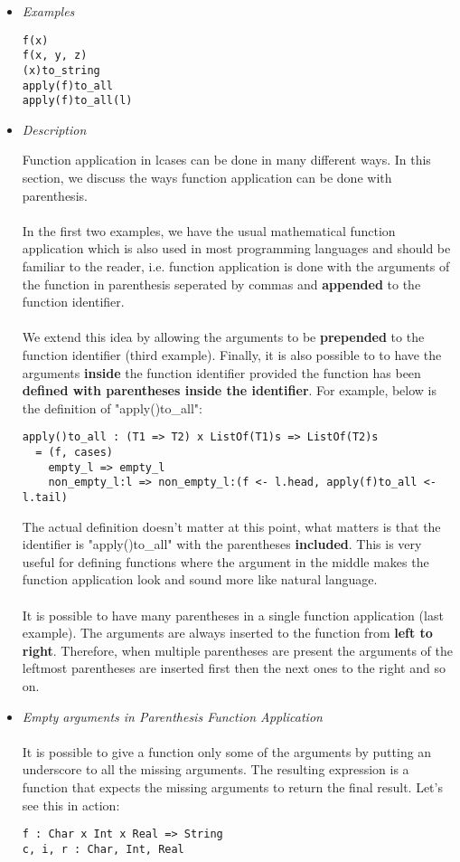 \documentclass{article}
\begin{document}
\begin{itemize}
\item \textit{Examples}

\begin{verbatim}
f(x)
f(x, y, z)
(x)to_string
apply(f)to_all
apply(f)to_all(l)
\end{verbatim}

\item \textit{Description}

Function application in lcases can be done in many different ways. In this
section, we discuss the ways function application can be done with parenthesis.
\\\\
In the first two examples, we have the usual mathematical function application
which is also used in most programming languages and should be familiar to the
reader, i.e. function application is done with the arguments of the function in
parenthesis seperated by commas and \textbf{appended} to the function
identifier.
\\\\
We extend this idea by allowing the arguments to be \textbf{prepended} to the
function identifier (third example). Finally, it is also possible to to have
the arguments \textbf{inside} the function identifier provided the function has
been \textbf{defined with parentheses inside the identifier}. For example,
below is the definition of "apply()to\_all":

\begin{verbatim}
apply()to_all : (T1 => T2) x ListOf(T1)s => ListOf(T2)s
  = (f, cases)
    empty_l => empty_l
    non_empty_l:l => non_empty_l:(f <- l.head, apply(f)to_all <- l.tail)
\end{verbatim}
The actual definition doesn't matter at this point, what matters is that the
identifier is "apply()to\_all" with the parentheses \textbf{included}. This is
very useful for defining functions where the argument in the middle makes the
function application look and sound more like natural language.
\\\\
It is possible to have many parentheses in a single function application (last
example). The arguments are always inserted to the function from \textbf{left
to right}.  Therefore, when multiple parentheses are present the arguments of
the leftmost parentheses are inserted first then the next ones to the right and
so on.

\newpage
\item \textit{Empty arguments in Parenthesis Function Application}
\\\\
It is possible to give a function only some of the arguments by putting an
underscore to all the missing arguments. The resulting expression is a function
that expects the missing arguments to return the final result. Let's see
this in action:
\begin{verbatim}
f : Char x Int x Real => String
c, i, r : Char, Int, Real


\end{verbatim}
\end{itemize}
\end{document}
